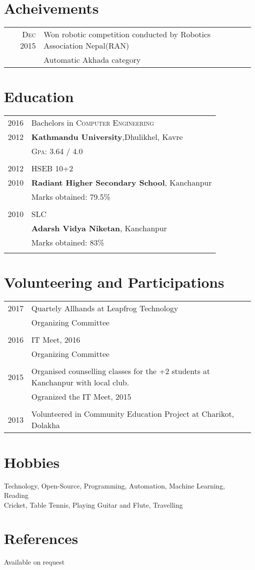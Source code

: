 \documentclass[a4paper,10pt]{article}
\begin{document}
\section{Acheivements}
\begin{tabular}{rl}	
 \textsc{Dec 2015}  & Won robotic competition conducted by Robotics Association Nepal(RAN) \\
 & Automatic Akhada category\\
\end{tabular}

\section{Education}
\begin{tabular}{rl}	
2016  & Bachelors in \textsc{Computer Engineering}\\
2012 & \textbf{Kathmandu University},Dhulikhel, Kavre\\
& \normalsize \textsc{Gpa}: 3.64 / 4.0\\\\
2012 & HSEB 10+2 \\ 
2010 &\normalsize\textbf{Radiant Higher Secondary School}, Kanchanpur\\
&Marks obtained: 79.5\%\\&\\
2010& SLC\\ & \textbf{Adarsh Vidya Niketan}, Kanchanpur\\
&Marks obtained: 83\%\\&\\
\end{tabular}

\section{Volunteering and Participations}
\begin{tabular}{rl}	
\textsc{2017}  & Quartely Allhands at Leapfrog Technology\\
 				& Organizing Committee\\\\
 \textsc{2016}  & IT Meet, 2016\\
 				& Organizing Committee\\\\
 \textsc{2015} & Organised counselling classes for the +2 students at Kanchanpur with local club.\\
 &Ogranized the IT Meet, 2015\\\\
 \textsc{2013} & Volunteered in Community Education Project at Charikot, Dolakha
\end{tabular}


\section{Hobbies}
Technology, Open-Source, Programming, Automation, Machine Learning, Reading\\
Cricket, Table Tennis, Playing Guitar and Flute, Travelling\\

\section{References}
Available on request
\end{document}
